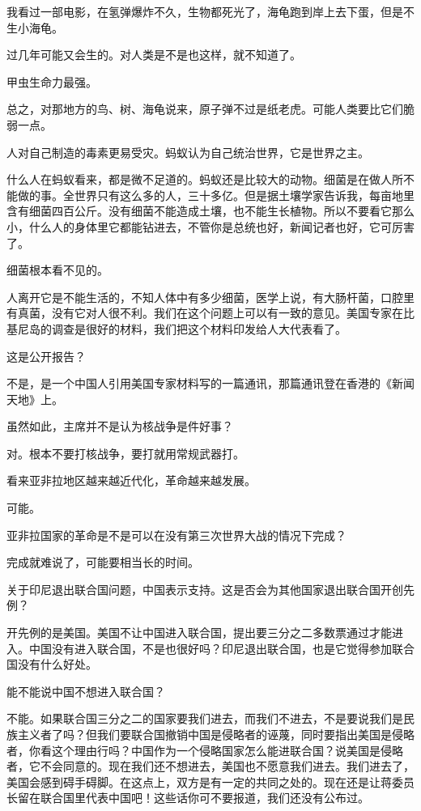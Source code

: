 我看过一部电影，在氢弹爆炸不久，生物都死光了，海龟跑到岸上去下蛋，但是不生小海龟。

过几年可能又会生的。对人类是不是也这样，就不知道了。

甲虫生命力最强。

总之，对那地方的鸟、树、海龟说来，原子弹不过是纸老虎。可能人类要比它们脆弱一点。

人对自己制造的毒素更易受灾。蚂蚁认为自己统治世界，它是世界之主。

什么人在蚂蚁看来，都是微不足道的。蚂蚁还是比较大的动物。细菌是在做人所不能做的事。全世界只有这么多的人，三十多亿。但是据土壤学家告诉我，每亩地里含有细菌四百公斤。没有细菌不能造成土壤，也不能生长植物。所以不要看它那么小，什么人的身体里它都能钻进去，不管你是总统也好，新闻记者也好，它可厉害了。

细菌根本看不见的。

人离开它是不能生活的，不知人体中有多少细菌，医学上说，有大肠杆菌，口腔里有真菌，没有它对人很不利。我们在这个问题上可以有一致的意见。美国专家在比基尼岛的调查是很好的材料，我们把这个材料印发给人大代表看了。

这是公开报告？

不是，是一个中国人引用美国专家材料写的一篇通讯，那篇通讯登在香港的《新闻天地》上。

虽然如此，主席并不是认为核战争是件好事？

对。根本不要打核战争，要打就用常规武器打。

看来亚非拉地区越来越近代化，革命越来越发展。

可能。

亚非拉国家的革命是不是可以在没有第三次世界大战的情况下完成？

完成就难说了，可能要相当长的时间。

关于印尼退出联合国问题，中国表示支持。这是否会为其他国家退出联合国开创先例？

开先例的是美国。美国不让中国进入联合国，提出要三分之二多数票通过才能进入。中国没有进入联合国，不是也很好吗？印尼退出联合国，也是它觉得参加联合国没有什么好处。

能不能说中国不想进入联合国？

不能。如果联合国三分之二的国家要我们进去，而我们不进去，不是要说我们是民族主义者了吗？但我们要联合国撤销中国是侵略者的诬蔑，同时要指出美国是侵略者，你看这个理由行吗？中国作为一个侵略国家怎么能进联合国？说美国是侵略者，它不会同意的。现在我们还不想进去，美国也不愿意我们进去。我们进去了，美国会感到碍手碍脚。在这点上，双方是有一定的共同之处的。现在还是让蒋委员长留在联合国里代表中国吧！这些话你可不要报道，我们还没有公布过。

